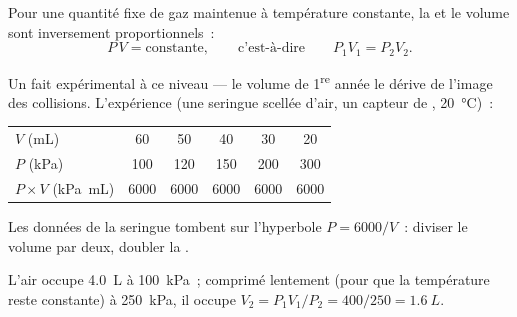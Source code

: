 \begin{proposition}\label{prop:g10:pressure:boyle}
Pour une quantité fixe de gaz maintenue à température constante, la
 et le volume sont inversement proportionnels~:
\[
P \, V = \text{constante},
\qquad\text{c'est-à-dire}\qquad
P_1 V_1 = P_2 V_2 .
\]
\end{proposition}
\admitted

\begin{remark}
Un fait expérimental à ce niveau --- le volume de 1\textsuperscript{re}
année le dérive de l'image des collisions. L'expérience (une seringue
scellée d'air, un capteur de ,
\qty{20}{\degreeCelsius})~:
\begin{center}
\begin{tabular}{lccccc}
$V$ (\unit{mL}) & 60 & 50 & 40 & 30 & 20 \\
$P$ (\unit{kPa}) & 100 & 120 & 150 & 200 & 300 \\
$P \times V$ (\unit{kPa.mL}) & 6000 & 6000 & 6000 & 6000 & 6000
\end{tabular}
\end{center}
\end{remark}

\begin{omfigure}

{\small Les données de la seringue tombent sur l'hyperbole $P = 6000/V$~:
diviser le volume par deux, doubler la .}
\end{omfigure}

\begin{example}\label{ex:g10:pressure:boyle}
L'air occupe \qty{4.0}{L} à \qty{100}{kPa}~; comprimé lentement (pour
que la température reste constante) à \qty{250}{kPa}, il occupe
$V_2 = P_1 V_1 / P_2 = 400/250 = \qty{1.6}{L}$.
\end{example}

